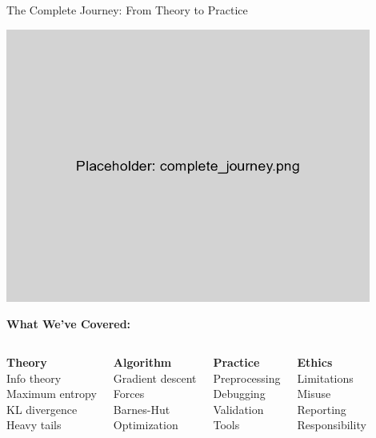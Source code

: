 \documentclass[aspectratio=169]{beamer}
\begin{document}
\begin{frame}{The Complete Journey: From Theory to Practice}
\begin{center}
\includegraphics[width=0.9\textwidth]{./Figures/complete_journey.png}
\end{center}

\textbf{What We've Covered:}
\begin{columns}
\textbf{Theory}\\
Info theory\\
Maximum entropy\\
KL divergence\\
Heavy tails

\textbf{Algorithm}\\
Gradient descent\\
Forces\\
Barnes-Hut\\
Optimization

\textbf{Practice}\\
Preprocessing\\
Debugging\\
Validation\\
Tools

\textbf{Ethics}\\
Limitations\\
Misuse\\
Reporting\\
Responsibility
\end{columns}
\end{frame}
\end{document}
